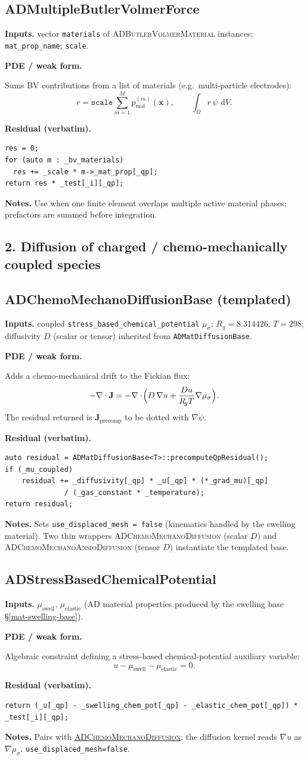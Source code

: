 \documentclass[11pt]{article}
\newcommand{\Rg}{R_{\!g}}           %
\newcommand{\dV}{\,\mathrm{d}V}
\newenvironment{ecmEntry}[1]{%
  \subsection{#1}%
}{}
\newcommand{\inputsRow}[1]{\par\noindent\textbf{Inputs.} #1\par}
\newcommand{\pdeRow}[1]{\par\noindent\textbf{PDE / weak form.}\par #1\par}
\newcommand{\codeRow}{\par\noindent\textbf{Residual (verbatim).}\par}
\newcommand{\notesRow}[1]{\par\noindent\textbf{Notes.} #1\par}
\begin{document}
\begin{ecmEntry}{ADMultipleButlerVolmerForce}
\inputsRow{vector \texttt{materials} of \textsc{ADButlerVolmerMaterial} instances;
\texttt{mat\_prop\_name}; \texttt{scale}.}
\pdeRow{Sums BV contributions from a list of materials (e.g.\ multi-particle electrodes):
\[
  r = \texttt{scale}\sum_{m=1}^{M} p^{(m)}_{\text{mat}}(\mathbf{x}),\qquad
  \int_\Omega r\,\psi\,\dV.
\]}
\codeRow\begin{lstlisting}
res = 0;
for (auto m : _bv_materials)
  res += _scale * m->_mat_prop[_qp];
return res * _test[_i][_qp];
\end{lstlisting}
\notesRow{Use when one finite element overlaps multiple active material phases;
prefactors are summed before integration.}
\end{ecmEntry}

\subsection*{2. Diffusion of charged / chemo-mechanically coupled species}

\begin{ecmEntry}{ADChemoMechanoDiffusionBase (templated)}
\label{kernel-cmm-diff}
\inputsRow{coupled \texttt{stress\_based\_chemical\_potential} $\mu_\sigma$;
$\Rg=8.314426,\,T=298$; diffusivity $D$ (scalar or tensor) inherited from
\texttt{ADMatDiffusionBase}.}
\pdeRow{Adds a chemo-mechanical drift to the Fickian flux:
\[
  -\nabla\cdot\mathbf{J} = -\nabla\cdot\!\Bigl(D\,\nabla u + \frac{D u}{\Rg T}\nabla\mu_\sigma\Bigr).
\]
The residual returned is $\mathbf{J}_{\text{precomp}}$ to be dotted with $\nabla\psi$.}
\codeRow\begin{lstlisting}
auto residual = ADMatDiffusionBase<T>::precomputeQpResidual();
if (_mu_coupled)
    residual += _diffusivity[_qp] * _u[_qp] * (*_grad_mu)[_qp]
              / (_gas_constant * _temperature);
return residual;
\end{lstlisting}
\notesRow{Sets \texttt{use\_displaced\_mesh = false} (kinematics handled by the swelling
material). Two thin wrappers \textsc{ADChemoMechanoDiffusion} (scalar $D$) and
\textsc{ADChemoMechanoAnsioDiffusion} (tensor $D$) instantiate the templated base.}
\end{ecmEntry}

\begin{ecmEntry}{ADStressBasedChemicalPotential}
\inputsRow{$\mu_{\text{swell}},\,\mu_{\text{elastic}}$ (AD material properties produced by
the swelling base \S\ref{mat-swelling-base}).}
\pdeRow{Algebraic constraint defining a stress-based chemical-potential auxiliary variable:
\[
  u - \mu_{\text{swell}} - \mu_{\text{elastic}} = 0.
\]}
\codeRow\begin{lstlisting}
return (_u[_qp] - _swelling_chem_pot[_qp] - _elastic_chem_pot[_qp]) * _test[_i][_qp];
\end{lstlisting}
\notesRow{Pairs with \hyperref[kernel-cmm-diff]{\textsc{ADChemoMechanoDiffusion}}: the
diffusion kernel reads $\nabla u$ as $\nabla\mu_\sigma$. \texttt{use\_displaced\_mesh=false}.}
\end{ecmEntry}
\end{document}

